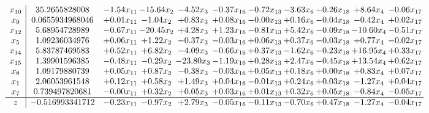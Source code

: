 \documentclass[9pt]{article}
\begin{document}
\[\begin{array}{c| c c@{\hskip 2pt} c@{\hskip 2pt} c@{\hskip 2pt} c@{\hskip 2pt} c@{\hskip 2pt} c@{\hskip 2pt} c@{\hskip 2pt} c@{\hskip 2pt} c@{\hskip 2pt} }
 x_{10}   &  35.2655828008 & -1.54 x_{11} & -15.64 x_{2} & -4.52 x_{3} & -0.37 x_{16} & -0.72 x_{13} & -3.63 x_{6} & -0.26 x_{18} & +  8.64 x_{4} & -0.06 x_{17}\\
 x_{9}   &  0.0655934968046 & +  0.01 x_{11} & -1.04 x_{2} & +  0.83 x_{3} & +  0.08 x_{16} & -0.00 x_{13} & +  0.16 x_{6} & -0.04 x_{18} & -0.42 x_{4} & +  0.02 x_{17}\\
 x_{12}   &  5.68954728989 & -0.67 x_{11} & -20.45 x_{2} & +  4.28 x_{3} & +  1.23 x_{16} & -0.81 x_{13} & +  5.42 x_{6} & -0.09 x_{18} & -10.60 x_{4} & -0.51 x_{17}\\
 x_{5}   &  1.09236034976 & +  0.06 x_{11} & +  1.22 x_{2} & -0.37 x_{3} & -0.03 x_{16} & +  0.06 x_{13} & +  0.37 x_{6} & -0.03 x_{18} & +  0.77 x_{4} & -0.02 x_{17}\\
 x_{14}   &  5.83787469583 & +  0.52 x_{11} & +  6.82 x_{2} & -4.09 x_{3} & -0.66 x_{16} & +  0.37 x_{13} & -1.62 x_{6} & -0.23 x_{18} & + 16.95 x_{4} & +  0.33 x_{17}\\
 x_{15}   &  1.39901596385 & -0.48 x_{11} & -0.29 x_{2} & -23.80 x_{3} & -1.19 x_{16} & +  0.28 x_{13} & +  2.47 x_{6} & -0.45 x_{18} & + 13.54 x_{4} & +  0.62 x_{17}\\
 x_{8}   &  1.09179880739 & +  0.05 x_{11} & +  0.87 x_{2} & -0.38 x_{3} & -0.03 x_{16} & +  0.05 x_{13} & +  0.18 x_{6} & +  0.00 x_{18} & +  0.83 x_{4} & +  0.07 x_{17}\\
 x_{1}   &  2.06053961548 & +  0.12 x_{11} & +  0.58 x_{2} & +  1.49 x_{3} & +  0.04 x_{16} & -0.01 x_{13} & +  0.24 x_{6} & +  0.03 x_{18} & -1.27 x_{4} & +  0.04 x_{17}\\
 x_{7}   &  0.739497820681 & -0.00 x_{11} & +  0.32 x_{2} & +  0.05 x_{3} & +  0.03 x_{16} & +  0.01 x_{13} & +  0.32 x_{6} & +  0.05 x_{18} & -0.84 x_{4} & -0.05 x_{17}\\
\hline
z    &  -0.516993341712 & -0.23 x_{11} & -0.97 x_{2} & +  2.79 x_{3} & -0.05 x_{16} & -0.11 x_{13} & -0.70 x_{6} & +  0.47 x_{18} & -1.27 x_{4} & -0.04 x_{17}\\
\end{array}\]
\end{document}
